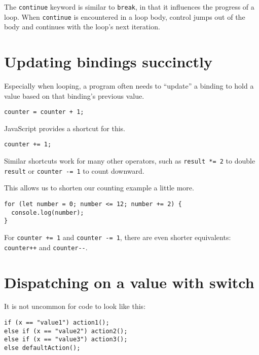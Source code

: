 The \lstinline`continue` keyword is similar to \lstinline`break`, in that it influences the progress of a loop. When \lstinline`continue` is encountered in a loop body, control jumps out of the body and continues with the loop's next iteration.

\section{Updating bindings succinctly}

Especially when looping, a program often needs to ``update'' a binding to hold a value based on that binding's previous value.

\begin{lstlisting}
counter = counter + 1;
\end{lstlisting}
\noindent

JavaScript provides a shortcut for this.

\begin{lstlisting}
counter += 1;
\end{lstlisting}
\noindent

Similar shortcuts work for many other operators, such as \lstinline`result *= 2` to double \lstinline`result` or \lstinline`counter -= 1` to count downward.

This allows us to shorten our counting example a little more.

\begin{lstlisting}
for (let number = 0; number <= 12; number += 2) {
  console.log(number);
}
\end{lstlisting}
\noindent{}

For \lstinline`counter += 1` and \lstinline`counter -= 1`, there are even shorter equivalents: \lstinline`counter++` and \lstinline`counter--`.

\section{Dispatching on a value with switch}

It is not uncommon for code to look like this:

\begin{lstlisting}
if (x == "value1") action1();
else if (x == "value2") action2();
else if (x == "value3") action3();
else defaultAction();
\end{lstlisting}
\noindent{}

